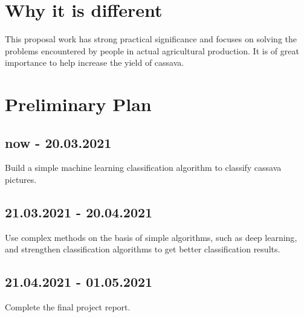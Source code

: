 \documentclass{article}
\begin{document}
\section{Why it is different}
This proposal work has strong practical significance and focuses on solving the problems encountered by people in actual agricultural production. It is of great importance to help increase the yield of cassava.

\section{Preliminary Plan}
\subsection{now - 20.03.2021}
Build a simple machine learning classification algorithm to classify cassava pictures.\cite{goodfellow2016deep}

\subsection{21.03.2021 - 20.04.2021}

Use complex methods on the basis of simple algorithms, such as deep learning\cite{bishop2006pattern}, and strengthen classification algorithms to get better classification results.

\subsection{21.04.2021 - 01.05.2021}
Complete the final project report.


\end{document}
